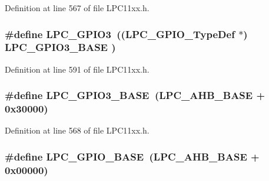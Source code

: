 Definition at line 567 of file L\+P\+C11xx.\+h.

\subsubsection[{\texorpdfstring{L\+P\+C\+\_\+\+G\+P\+I\+O3}{LPC_GPIO3}}]{\setlength{\rightskip}{0pt plus 5cm}\#define L\+P\+C\+\_\+\+G\+P\+I\+O3~(({\bf L\+P\+C\+\_\+\+G\+P\+I\+O\+\_\+\+Type\+Def}   $\ast$) {\bf L\+P\+C\+\_\+\+G\+P\+I\+O3\+\_\+\+B\+A\+SE} )}\hypertarget{group___l_p_c11xx___definitions_ga6e961eb01d0f1e61dd9b9d5979d2aafc}{}\label{group___l_p_c11xx___definitions_ga6e961eb01d0f1e61dd9b9d5979d2aafc}


Definition at line 591 of file L\+P\+C11xx.\+h.

\subsubsection[{\texorpdfstring{L\+P\+C\+\_\+\+G\+P\+I\+O3\+\_\+\+B\+A\+SE}{LPC_GPIO3_BASE}}]{\setlength{\rightskip}{0pt plus 5cm}\#define L\+P\+C\+\_\+\+G\+P\+I\+O3\+\_\+\+B\+A\+SE~({\bf L\+P\+C\+\_\+\+A\+H\+B\+\_\+\+B\+A\+SE}  + 0x30000)}\hypertarget{group___l_p_c11xx___definitions_ga56c68c5326b521b3278a35f4d81369a9}{}\label{group___l_p_c11xx___definitions_ga56c68c5326b521b3278a35f4d81369a9}


Definition at line 568 of file L\+P\+C11xx.\+h.

\subsubsection[{\texorpdfstring{L\+P\+C\+\_\+\+G\+P\+I\+O\+\_\+\+B\+A\+SE}{LPC_GPIO_BASE}}]{\setlength{\rightskip}{0pt plus 5cm}\#define L\+P\+C\+\_\+\+G\+P\+I\+O\+\_\+\+B\+A\+SE~({\bf L\+P\+C\+\_\+\+A\+H\+B\+\_\+\+B\+A\+SE}  + 0x00000)}\hypertarget{group___l_p_c11xx___definitions_ga5feb4a6692784a25eaed627661bd8f36}{}\label{group___l_p_c11xx___definitions_ga5feb4a6692784a25eaed627661bd8f36}


